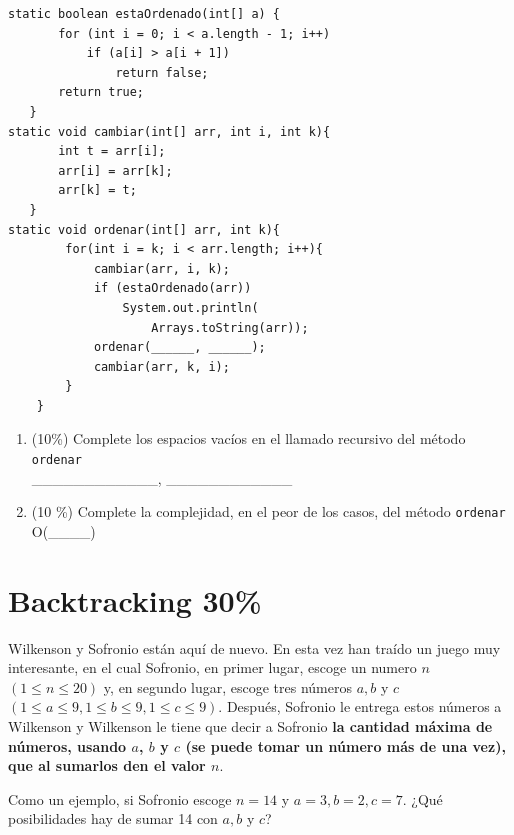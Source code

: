\documentclass[twocolumn]{article}
\begin{document}
{\small
\begin{verbatim}
static boolean estaOrdenado(int[] a) {
       for (int i = 0; i < a.length - 1; i++)
           if (a[i] > a[i + 1]) 
               return false;
       return true;
   }
static void cambiar(int[] arr, int i, int k){
       int t = arr[i];
       arr[i] = arr[k];
       arr[k] = t;
   }
static void ordenar(int[] arr, int k){
        for(int i = k; i < arr.length; i++){
            cambiar(arr, i, k);
            if (estaOrdenado(arr))
                System.out.println(
                    Arrays.toString(arr));  
            ordenar(______, ______);
            cambiar(arr, k, i);
        }
    }
\end{verbatim}
}

\begin{enumerate}[label=\Alph*]
  \item (10\%) Complete los espacios vacíos en el llamado recursivo del método \texttt{ordenar}\\

  \_\_\_\_\_\_\_\_\_\_\_\_, \_\_\_\_\_\_\_\_\_\_\_\_


\item (10 \%) Complete la complejidad, en el peor de los casos,
del método \texttt{ordenar}\\

  O(\_\_\_\_)

\end{enumerate}






\section{Backtracking 30\%}


Wilkenson y Sofronio están aquí de nuevo. En esta vez han traído un juego muy interesante, en el cual Sofronio, en primer lugar, escoge un numero $n$ $(1 \leq n \leq 20)$ y, en segundo lugar, escoge tres números $a, b$ y $c$ $(1 \leq a \leq 9, 1 \leq b \leq 9, 1 \leq c \leq 9)$. Después, Sofronio le entrega estos números a Wilkenson y Wilkenson le tiene que decir a Sofronio \textbf{la cantidad máxima de números, usando  $a$, $b$ y $c$ (se puede tomar un número más de una vez),  que al sumarlos den el valor $n$}. 

Como un ejemplo, si Sofronio escoge $n = 14$ y $a = 3, b = 2, c = 7$. ¿Qué posibilidades hay de sumar 14 con $a, b$ y $c$?\\
\end{document}
